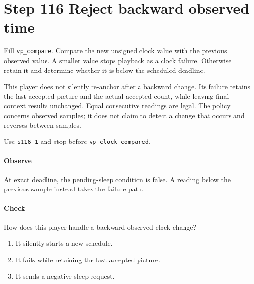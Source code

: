 \section{Step 116 Reject backward observed time}
Fill \texttt{vp\_compare}. Compare the new unsigned clock value with the previous observed value. A smaller value stops playback as a clock failure. Otherwise retain it and determine whether it is below the scheduled deadline.

This player does not silently re-anchor after a backward change. Its failure retains the last accepted picture and the actual accepted count, while leaving final context results unchanged. Equal consecutive readings are legal. The policy concerns observed samples; it does not claim to detect a change that occurs and reverses between samples.

Use \texttt{s116-1} and stop before \texttt{vp\_clock\_compared}.

\paragraph{Observe} At exact deadline, the pending-sleep condition is false. A reading below the previous sample instead takes the failure path.

\paragraph{Check} How does this player handle a backward observed clock change?
\begin{enumerate}[label=\Alph*.]
\item It silently starts a new schedule.
\item It fails while retaining the last accepted picture.
\item It sends a negative sleep request.
\end{enumerate}
